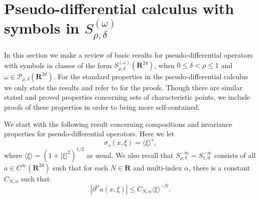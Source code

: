 \documentclass[12pt,a4paper,reqno]{amsart}
\numberwithin{equation}{section}
\numberwithin{thm}{section}
\theoremstyle{definition}
\theoremstyle{remark}
\begin{document}
\par

\section{Pseudo-differential calculus with symbols
in $S^{(\omega )}_{\rho ,\delta}$}\label{sec2}

\par

In this section we make a review of basic results for
pseudo-differential operators with symbols in classes of the form
$S^{(\omega )}_{\rho ,\delta}({\mathbf R^{{2d}}})$, when $0\le \delta <\rho \le
1$ and $\omega \in \mathscr P_{\rho ,\delta}({\mathbf R^{{2d}}})$. For the
standard properties in the pseudo-differential calculus we only state
the results and refer to \cite{Ho1} for the proofs. Though there are
similar stated and
proved properties concerning sets of characteristic points, we include
proofs of these properties in order to being more self-contained.

\par

We start with the following result concerning compositions and
invariance properties for pseudo-differential operators. Here we let
$$
\sigma _s(x,\xi )={\langle \xi\rangle} ^s,
$$
where ${\langle \xi\rangle} =(1+|\xi
|^2)^{1/2}$ as usual. We also recall that $S^{-\infty }_{\rho ,\delta
}=S^{-\infty }_{1,0}$ consists of all $a\in C^\infty ({\mathbf R^{{2d}}})$ such
that for each $N\in \mathbf R$ and multi-index $\alpha$, there is a
constant $C_{N,\alpha}$ such that
$$
|\partial ^\alpha a(x,\xi )|\le C_{N,\alpha}{\langle \xi\rangle} ^{-N}.
$$

\par
\end{document}
